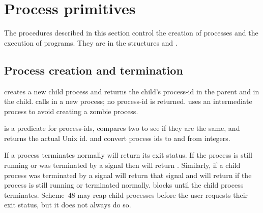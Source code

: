 \section{Process primitives}

The procedures described in this section control the creation of processes
 and the execution of programs.
They are in the structures  and .

\subsection{Process creation and termination}
\label{processes}

\begin{protos}
\end{protos}
\noindent
{} creates a new child process and returns the child's process-id in
 the parent and  in the child.
 calls  in a new process; no process-id
 is returned.
 uses an intermediate process to avoid creating
 a zombie process.

\begin{protos}
\end{protos}
\noindent
 is a predicate for process-ids,
 compares two to see if they are the same,
 and  returns the actual Unix id.
 and 
 convert process ids to and from integers.

\begin{protos}
\end{protos}
\noindent
If a process terminates normally
  will return its exit status.
If the process is still running or was terminated by a signal then
  will return .
Similarly, if a child process was terminated by a signal
  will return that signal and
 will return  if the process is still running or terminated
 normally.
 blocks until the child process terminates.
Scheme~48 may reap child processes before the user requests their
 exit status, but it does not always do so.

